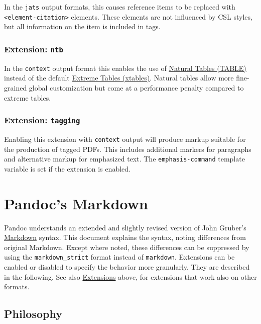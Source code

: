\documentclass[
  b5paper
]{book}
\begin{document}
In the \texttt{jats} output formats, this causes reference items to be
replaced with \texttt{\textless{}element-citation\textgreater{}}
elements. These elements are not influenced by CSL styles, but all
information on the item is included in tags.

\subsection{\texorpdfstring{Extension:
\texttt{ntb}}{Extension: ntb}}\label{extension-ntb}

In the \texttt{context} output format this enables the use of
\href{https://wiki.contextgarden.net/TABLE}{Natural Tables (TABLE)}
instead of the default
\href{https://wiki.contextgarden.net/xtables}{Extreme Tables (xtables)}.
Natural tables allow more fine-grained global customization but come at
a performance penalty compared to extreme tables.

\subsection{\texorpdfstring{Extension:
\texttt{tagging}}{Extension: tagging}}\label{extension--tagging}

Enabling this extension with \texttt{context} output will produce markup
suitable for the production of tagged PDFs. This includes additional
markers for paragraphs and alternative markup for emphasized text. The
\texttt{emphasis-command} template variable is set if the extension is
enabled.

\chapter{Pandoc's Markdown}\label{pandocs-markdown}

Pandoc understands an extended and slightly revised version of John
Gruber's \href{https://daringfireball.net/projects/markdown/}{Markdown}
syntax. This document explains the syntax, noting differences from
original Markdown. Except where noted, these differences can be
suppressed by using the \texttt{markdown\_strict} format instead of
\texttt{markdown}. Extensions can be enabled or disabled to specify the
behavior more granularly. They are described in the following. See also
\hyperref[extensions]{Extensions} above, for extensions that work also
on other formats.

\section{Philosophy}\label{philosophy}
\end{document}
